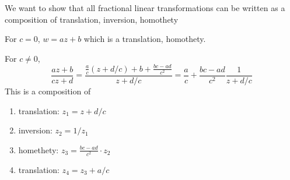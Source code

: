 \documentclass[a4paper,12pt]{article}
\begin{document}
We want to show that all fractional linear transformations can be written as a composition of translation, inversion, homothety

For $c=0$, $w=az+b$ which is a translation, homothety.

For $c\neq0$, \begin{equation}
    \frac{az+b}{cz+d}=\frac{\frac{a}{c}(z+d/c)+b+\frac{bc-ad}{c^2}}{z+d/c}=\frac{a}{c}+\frac{bc-ad}{c^2}\frac{1}{z+d/c}
\end{equation}
This is a composition of \begin{enumerate}
    \item translation: $z_1=z+d/c$
    \item inversion: $z_2=1/z_1$
    \item homethety: $z_3=\frac{bc-ad}{c^2}\cdot z_2$
    \item translation: $z_4=z_3+a/c$
\end{enumerate}
\end{document}
